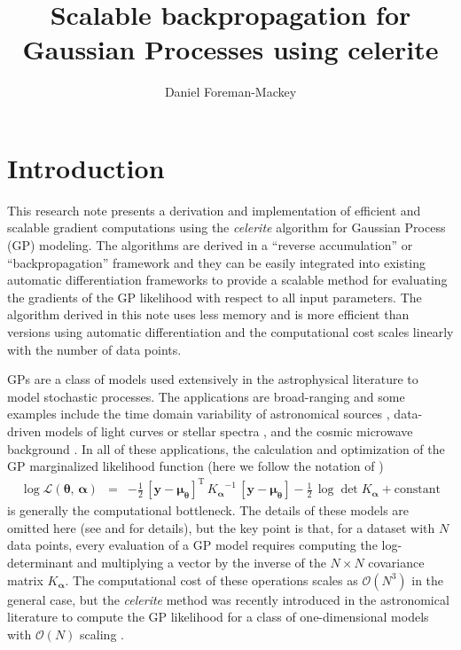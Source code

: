 \documentclass[rnaas]{aastex62}
\newcommand{\eqlabel}[1]{\label{eq:#1}}
\newcommand{\T}{\ensuremath{\mathrm{T}}}
\newcommand{\bvec}[1]{{\ensuremath{\boldsymbol{#1}}}}
\begin{document}
\raggedbottom\sloppy\sloppypar\frenchspacing

\title{%
    Scalable backpropagation for Gaussian Processes using celerite
}

\author[0000-0002-9328-5652]{Daniel Foreman-Mackey}


\section{Introduction}

This research note presents a derivation and implementation of efficient and
scalable gradient computations using the \emph{celerite} algorithm for Gaussian
Process (GP) modeling.
The algorithms are derived in a ``reverse accumulation'' or
``backpropagation'' framework and they can be easily integrated into existing
automatic differentiation frameworks to provide a scalable method for
evaluating the gradients of the GP likelihood with respect to all input
parameters.
The algorithm derived in this note uses less memory and is more efficient than
versions using automatic differentiation and the computational cost scales
linearly with the number of data points.

GPs \citep{Rasmussen:2006} are a class of models used
extensively in the astrophysical literature to model stochastic processes.
The applications are broad-ranging and some examples include the time domain
variability of astronomical sources \citep{Brewer:2009, Kelly:2014,
Haywood:2014, Rajpaul:2015, Foreman-Mackey:2017, Angus:2018}, data-driven
models of light curves or stellar spectra \citep{Wang:2012, Luger:2016,
Czekala:2017}, and the cosmic microwave background
\citep{Bond:1987,Wandelt:2003}.
In all of these applications, the calculation and optimization of the GP
marginalized likelihood function (here we follow the notation of
\citealt{Foreman-Mackey:2017})
\begin{eqnarray}\eqlabel{loglike}
\log \mathcal{L}(\bvec{\theta},\,\bvec{\alpha}) &=&
    -\frac{1}{2}\,\left[\bvec{y} - \bvec{\mu}_\bvec{\theta}\right]^\T\,
        {K_\bvec{\alpha}}^{-1}\,\left[\bvec{y}-\bvec{\mu}_\bvec{\theta}\right]
    -\frac{1}{2}\,\log\det K_\bvec{\alpha} + \mathrm{constant}
\end{eqnarray}
is generally the computational bottleneck.
The details of these models are omitted here (see \citealt{Rasmussen:2006} and
\citealt{Foreman-Mackey:2017} for details), but the key point is that, for a
dataset with $N$ data points, every evaluation of a GP model requires
computing the log-determinant and multiplying a vector by the inverse of
the $N \times N$ covariance matrix $K_\bvec{\alpha}$.
The computational cost of these operations scales as $\mathcal{O}(N^3)$ in the
general case, but the \emph{celerite} method was recently introduced in the
astronomical literature to compute the GP likelihood for a class of
one-dimensional models with $\mathcal{O}(N)$ scaling
\citep{Ambikasaran:2015, Foreman-Mackey:2017}.
\end{document}
